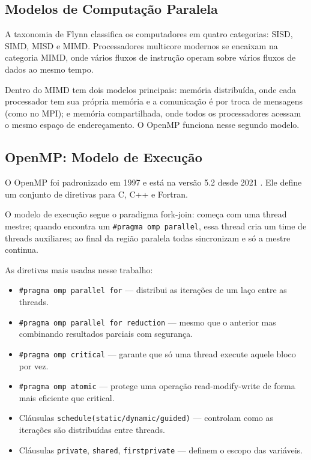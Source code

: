 \documentclass[12pt]{article}
\begin{document}
\subsection{Modelos de Computação Paralela}

A taxonomia de Flynn \cite{flynn1972} classifica os computadores em quatro categorias: SISD, SIMD, MISD e MIMD. Processadores multicore modernos se encaixam na categoria MIMD, onde vários fluxos de instrução operam sobre vários fluxos de dados ao mesmo tempo.

Dentro do MIMD tem dois modelos principais: memória distribuída, onde cada processador tem sua própria memória e a comunicação é por troca de mensagens (como no MPI); e memória compartilhada, onde todos os processadores acessam o mesmo espaço de endereçamento. O OpenMP funciona nesse segundo modelo.

\subsection{OpenMP: Modelo de Execução}

O OpenMP foi padronizado em 1997 e está na versão 5.2 desde 2021 \cite{openmp52}. Ele define um conjunto de diretivas para C, C++ e Fortran.

O modelo de execução segue o paradigma fork-join: começa com uma thread mestre; quando encontra um \texttt{\#pragma omp parallel}, essa thread cria um time de threads auxiliares; ao final da região paralela todas sincronizam e só a mestre continua.

As diretivas mais usadas nesse trabalho:

\begin{itemize}
    \item \texttt{\#pragma omp parallel for} --- distribui as iterações de um laço entre as threads.
    \item \texttt{\#pragma omp parallel for reduction} --- mesmo que o anterior mas combinando resultados parciais com segurança.
    \item \texttt{\#pragma omp critical} --- garante que só uma thread execute aquele bloco por vez.
    \item \texttt{\#pragma omp atomic} --- protege uma operação read-modify-write de forma mais eficiente que critical.
    \item Cláusulas \texttt{schedule(static/dynamic/guided)} --- controlam como as iterações são distribuídas entre threads.
    \item Cláusulas \texttt{private}, \texttt{shared}, \texttt{firstprivate} --- definem o escopo das variáveis.
\end{itemize}
\end{document}
